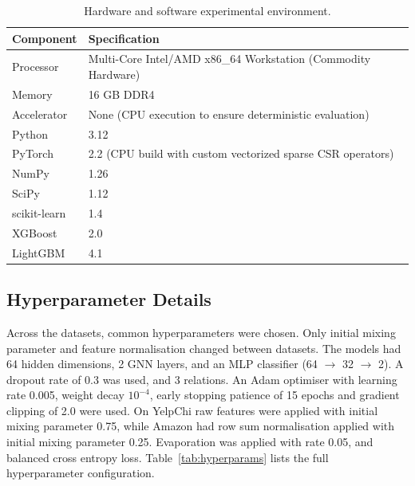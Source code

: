 \begin{table}[htbp]
\centering
\small
\caption[Hardware and software experimental environment]{Hardware and software experimental environment.}
\label{tab:hardware_software}
\begin{tabular*}{\textwidth}{@{\extracolsep{\fill}}ll}
\toprule
\textbf{Component} & \textbf{Specification} \\
\midrule
Processor       & Multi-Core Intel/AMD x86\_64 Workstation (Commodity Hardware) \\
Memory          & 16 GB DDR4 \\
Accelerator     & None (CPU execution to ensure deterministic evaluation) \\
Python          & 3.12 \\
PyTorch         & 2.2 (CPU build with custom vectorized sparse CSR operators) \\
NumPy           & 1.26 \\
SciPy           & 1.12 \\
scikit-learn    & 1.4 \\
XGBoost         & 2.0 \\
LightGBM        & 4.1 \\
\bottomrule
\end{tabular*}
\end{table}

\subsection{Hyperparameter Details}

Across the datasets, common hyperparameters were chosen. Only initial mixing parameter and feature normalisation changed between datasets. The models had 64 hidden dimensions, 2 GNN layers, and an MLP classifier (64 $\to$ 32 $\to$ 2). A dropout rate of 0.3 was used, and 3 relations. An Adam optimiser with learning rate 0.005, weight decay $10^{-4}$, early stopping patience of 15 epochs and gradient clipping of 2.0 were used. On YelpChi raw features were applied with initial mixing parameter 0.75, while Amazon had row sum normalisation applied with initial mixing parameter 0.25. Evaporation was applied with rate 0.05, and balanced cross entropy loss. Table~\ref{tab:hyperparams} lists the full hyperparameter configuration.

